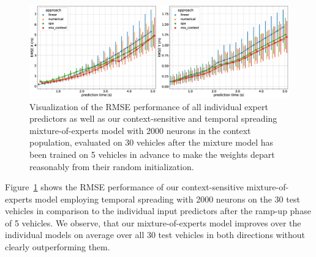 \begin{figure}[t]
    \centering
    \includegraphics[width=0.95\linewidth]{imgs/mix_vs_other_approaches_over_objects.eps}
    \caption{Visualization of the \ac{RMSE} performance of all individual expert predictors as well as our context-sensitive and temporal spreading mixture-of-experts model with \num{2000} neurons in the context population, evaluated on \num{30} vehicles after the mixture model has been trained on \num{5} vehicles in advance to make the weights depart reasonably from their random initialization.}
    \label{fig:mix_vs_other_approaches_over_objects}
\end{figure}

Figure~\ref{fig:mix_vs_other_approaches_over_objects} shows the \ac{RMSE} performance of our context-sensitive mixture-of-experts model employing temporal spreading with \num{2000} neurons on the \num{30} test vehicles in comparison to the individual input predictors after the ramp-up phase of \num{5} vehicles.
We observe, that our mixture-of-experts model improves over the individual models on average over all \num{30} test vehicles in both directions without clearly outperforming them.

